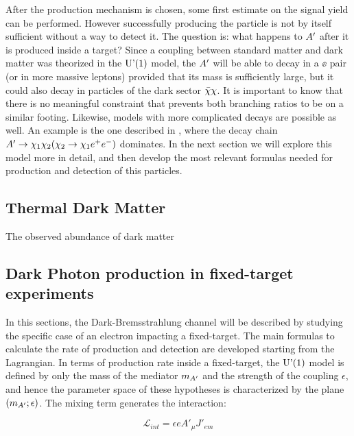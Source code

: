 After the production mechanism is chosen, some first estimate on the signal yield can be performed. However successfully producing the particle is not by itself sufficient without a way to detect it. The question is: what happens to $A'$ after it is produced inside a target? Since a coupling between standard matter and dark matter was theorized in the $\textrm{U'(1)}$ model, the $A'$ will be able to decay in a $\ee$ pair (or in more massive leptons) provided that its mass is sufficiently large, but it could also decay in particles of the dark sector $\bar{\chi} \chi$. It is important to know that there is no meaningful constraint that prevents both branching ratios to be on a similar footing. Likewise, models with more complicated decays are possible as well. An example is the one described in \cite{Mohlabeng_2019}, where the decay chain $A' \to \chi_1 \chi_2(\chi_2 \to \chi_1 e^+e^-)$ dominates. In the next section we will explore this model more in detail, and then develop the most relevant formulas needed for production and detection of this particles.

\subsection{Thermal Dark Matter}
\label{ch1:sec:thermal-dm}

The observed abundance of dark matter



\subsection{Dark Photon production in fixed-target experiments}
\label{ch1:sec:dm-u1model}

In this sections, the Dark-Bremsstrahlung channel will be described by studying the specific case of an electron impacting a fixed-target. The main formulas to calculate the rate of production and detection are developed starting from the Lagrangian. In terms of production rate inside a fixed-target, the $\textrm{U'(1)}$ model is defined by only the mass of the mediator $m_{A'}$ and the strength of the coupling $\epsilon$, and hence the parameter space of these hypotheses is characterized by the plane $(m_{A'};\epsilon)$. The mixing term generates the interaction:

\begin{equation}
  \label{eq:dm-interaction}
  \mathcal{L}_{int} = \epsilon e A'_{\mu}J'_{em}
\end{equation}

